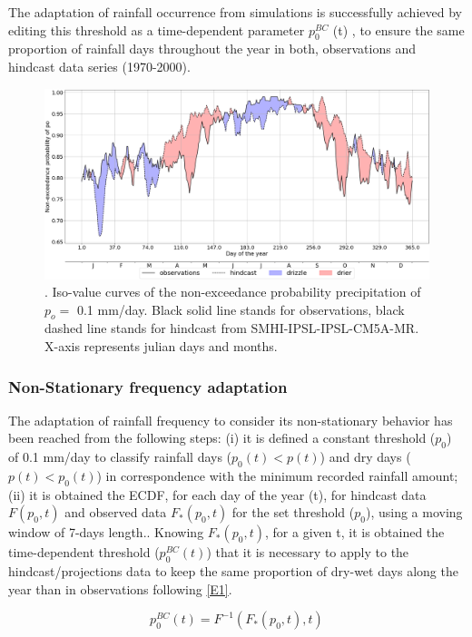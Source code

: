 \documentclass[a4paper,11pt]{article}
\begin{document}
The adaptation of rainfall occurrence from simulations is successfully achieved by editing this threshold as a time-dependent parameter $p_{0}^{BC}$ (t)  , to ensure the same proportion of rainfall days throughout the year in both, observations and hindcast data series (1970-2000). 


\begin{figure}[H]  %
\centering
\includegraphics[scale=0.26]{Fig1.PNG}
\caption{. Iso-value curves of the non-exceedance probability precipitation of $p_{o}=$ 0.1 mm/day. Black solid line stands for observations, black dashed line stands for hindcast from SMHI-IPSL-IPSL-CM5A-MR. X-axis represents julian days and months. }
\label{F1}
\end{figure}


\subsubsection{Non-Stationary frequency adaptation} 
The adaptation of rainfall frequency to consider its non-stationary behavior has been reached from the following steps: (i) it is defined a constant threshold ($p_{0}$) of 0.1 mm/day to classify rainfall days ($p_{0}(t) < p(t)$) and dry days ($p(t) < p_{0}(t)$) in correspondence with the minimum recorded rainfall amount; (ii) it is obtained the ECDF, for each day of the year (t), for hindcast data $F(p_{0}  ,t)$ and observed data $F_{*} (p_{0}  ,t)$ for the set threshold ($p_{0}$), using a moving window of 7-days length.. Knowing $F_{*}(p_{0},t)$,  for a given t, it is obtained the time-dependent threshold ($p_0^{BC}(t)$) that it is necessary to apply to the hindcast/projections data to keep the same proportion of dry-wet days along the year than in observations following \ref{E1}.

\begin{equation}
p_0^{BC}(t) = F^{-1}(F_*(p_0,t),t)
\label{E1}
\end{equation}
\end{document}
